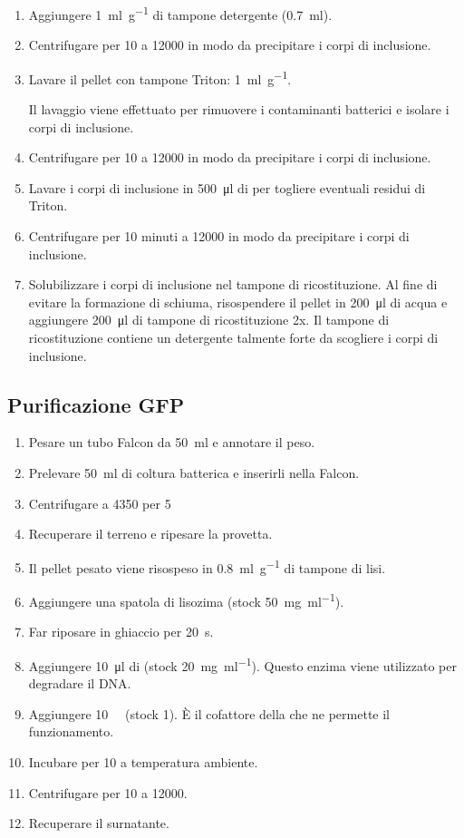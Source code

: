 \begin{enumerate}
	\item Aggiungere \qty{1}{\ml\per\g} di tampone detergente (\qty{0.7}{\ml}).
	\item Centrifugare per \qty{10}{\min} a \qty{12000}{\giri} in modo da precipitare i corpi di inclusione.
	\item Lavare il pellet con tampone Triton: \qty{1}{\ml\per\g}.
	      \begin{Note}
		      Il lavaggio viene effettuato per rimuovere i contaminanti batterici e isolare i corpi di inclusione.
	      \end{Note}
	\item Centrifugare per \qty{10}{\min} a \qty{12000}{\giri} in modo da precipitare i corpi di inclusione.
	\item Lavare i corpi di inclusione in \qty{500}{\micro\litre} di  per togliere eventuali residui di Triton.
	\item Centrifugare per 10 minuti a \qty{12000}{\giri} in modo da precipitare i corpi di inclusione.
	\item Solubilizzare i corpi di inclusione nel tampone di ricostituzione. Al fine di evitare la formazione di schiuma, risospendere il pellet in \qty{200}{\micro\litre} di acqua e aggiungere \qty{200}{\micro\litre} di tampone di ricostituzione 2x. Il tampone di ricostituzione contiene un detergente talmente forte da scogliere i corpi di inclusione.
\end{enumerate}

\subsection{Purificazione GFP}
\begin{enumerate}
	\item Pesare un tubo Falcon da \qty{50}{\ml} e annotare il peso.
	\item Prelevare \qty{50}{\ml} di coltura batterica e inserirli nella Falcon.
	\item Centrifugare a \qty{4350}{\giri} per \qty{5}{\min}
	\item Recuperare il terreno e ripesare la provetta.
	\item Il pellet pesato viene risospeso in \qty{0.8}{\ml\per\g} di tampone di lisi.
	\item Aggiungere una spatola di lisozima (stock \qty{50}{\mg\per\ml}).
	\item Far riposare in ghiaccio per \qty{20}{\s}.
	\item Aggiungere \qty{10}{\micro\litre} di  (stock \qty{20}{\mg\per\ml}). Questo enzima viene utilizzato per degradare il DNA.
	\item Aggiungere \qty{10}{\milli\Molar}  (stock \qty{1}{\Molar}). È il cofattore della  che ne permette il funzionamento.
	\item Incubare per \qty{10}{\min} a temperatura ambiente.
	\item Centrifugare per  \qty{10}{\min} a \qty{12000}{\giri}.
	\item Recuperare il surnatante.
\end{enumerate}



